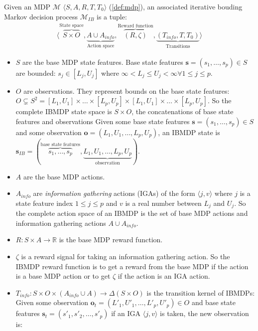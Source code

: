 \begin{definition}\label{def:ibmdp}
Given an MDP $\mathcal{M}$ $\langle S, A, R, T, T_0 \rangle$ (\ref{def:mdp}), an associated iterative bouding Markov decision process $\mathcal{M}_{IB}$ is a tuple:
\begin{align*}
    \langle \overbrace{S \times O}^{\text{State space}}, \underbrace{A \cup A_{info}}_{\text{Action space}}, \overbrace{(R, \zeta)}^{\text{Reward function}}, \underbrace{(T_{info}, T, T_0)}_{\text{Transitions}}\rangle
\end{align*}

\begin{itemize}
\item $S$ are the base MDP state features. Base state features $\boldsymbol{s} = (s_1, \dots, s_p)\in S$ are bounded: $s_j \in [L_j, U_j]$ where $\infty < L_j \leq U_j < \infty \forall 1\leq j \leq p$.
\item $O$ are observations. They represent bounds on the base state features: $O\subsetneq S^2 =  [L_1, U_1]\times \dots \times [L_p, U_p] \times [L_1, U_1]\times \dots \times [L_p, U_p]$. So the complete IBMDP state space is $S \times O$, the concatenations of base state features and observations
Given some base state features $\boldsymbol{s} = (s_1, \dots, s_p)\in S$ and some observation $\boldsymbol{o} = (L_1, U_1, \dots, L_p, U_p)$, an IBMDP state is $\boldsymbol{s}_{IB} = (\overbrace{s_1, \dots, s_p}^{\text{base state features}}, \underbrace{L_1, U_1, \dots, L_p, U_p}_{\text{observation}})$.
\item $A$ are the base MDP actions.
\item $A_{info}$ are \textit{information gathering} actions (IGAs) of the form $\langle j, v \rangle$ where $j$ is a state feature index $1 \leq j \leq p$ and $v$ is a real number between $L_j$ and $U_j$. So the complete action space of an IBMDP is the set of base MDP actions and information gathering actions $A \cup A_{info}$.
\item $R: S\times A \rightarrow \mathbb{R}$ is the base MDP reward function.
\item $\zeta$ is a reward signal for taking an information gathering action.
So the IBMDP reward function is to get a reward from the base MDP if the action is a base MDP action or to get $\zeta$ if the action is an IGA action.
\item $T_{info}: S\times O \times( A_{info} \cup A )\rightarrow \Delta (S\times O)$ is the transition kernel of IBMDPs: 
Given some observation $\boldsymbol{o}_t = (L'_1, U'_1, \dots, L'_p, U'_p) \in O$ and base state features $\boldsymbol{s}_t=(s'_1, s'_2, \dots, s'_p)$ if an IGA $\langle j, v \rangle$ is taken, the new observation is:

\end{itemize}
\end{definition}
